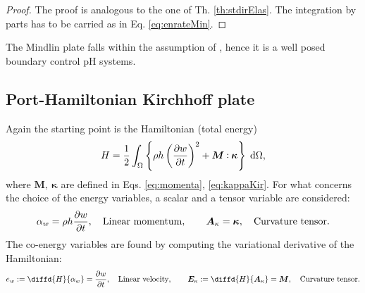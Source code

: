 \begin{theorem}
\begin{proof}
The proof is analogous to the one of Th. \ref{th:stdirElas}. The integration by parts has to be carried as in Eq. \eqref{eq:enrateMin}.
\end{proof}

\end{theorem}
The Mindlin plate falls within the assumption of \cite{skrepek2019wellposedness}, hence it is a well posed boundary control pH systems.
	

\subsection{Port-Hamiltonian Kirchhoff plate}\label{sec:pHkirchh}
Again the starting point is the Hamiltonian (total energy)
\begin{equation}
\label{eq:Hkir}
H = \frac{1}{2} \int_{\Omega} \left\{\rho h \left(\diffp{w}{t} \right)^2 + \bm{M} \cddot \bm{\kappa}  \right\}  \d{\Omega} ,
\end{equation}
where $\bm{M}, \ \bm{\kappa}$ are defined in Eqs. \eqref{eq:momenta}, \eqref{eq:kappaKir}. For what concerns the choice of the energy variables, a scalar and a tensor variable are considered:
\begin{equation}
\alpha_w = \rho h \diffp{w}{t}, \quad \text{Linear momentum}, \qquad \bm{A}_{\kappa} = \bm{\kappa}, \quad \text{Curvature tensor}.	\end{equation}
The co-energy variables are found by computing the variational derivative of the Hamiltonian:
\begin{equation}
e_w := \diffd{H}{\alpha_w} = \diffp{w}{t}, \quad \text{Linear velocity},  \qquad  \bm{E}_{\kappa} := \diffd{H}{\bm{A}_{\kappa}} = \bm{M}, \quad \text{Curvature tensor}.
\end{equation}

